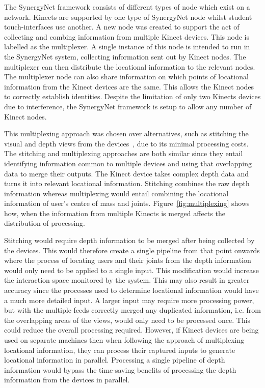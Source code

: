 \documentclass[link]{IWCOMP}
\begin{document}
The SynergyNet framework consists of different types of node which exist on a network.
Kinects are supported by one type of SynergyNet node whilst student touch-interfaces use another.
A new node was created to support the act of collecting and combing information from multiple Kinect devices.
This node is labelled as the multiplexer.
A single instance of this node is intended to run in the SynergyNet system, collecting information sent out by Kinect nodes.
The multiplexer can then distribute the locational information to the relevant nodes.
The multiplexer node can also share information on which points of locational information from the Kinect devices are the same.
This allows the Kinect nodes to correctly establish identities.
Despite the limitation of only two Kinects devices due to interference, the SynergyNet framework is setup to allow any number of Kinect nodes.

This multiplexing approach was chosen over alternatives, such as stitching the visual and depth views from the devices~\cite{Dubois2011}, due to its minimal processing costs.
The stitching and multiplexing approaches are both similar since they entail identifying information common to multiple devices and using that overlapping data to merge their outputs.
The Kinect device takes complex depth data and turns it into relevant locational information.
Stitching combines the raw depth information whereas multiplexing would entail combining the locational information of user's centre of mass and joints.
Figure~\ref{fig:multiplexing} shows how, when the information from multiple Kinects is merged affects the distribution of processing.

Stitching would require depth information to be merged after being collected by the devices.
This would therefore create a single pipeline from that point onwards where the process of locating users and their joints from the depth information would only need to be applied to a single input.
This modification would increase the interaction space monitored by the system.
This may also result in greater accuracy since the processes used to determine locational information would have a much more detailed input.
A larger input may require more processing power, but with the multiple feeds correctly merged any duplicated information, i.e. from the overlapping areas of the views, would only need to be processed once.
This could reduce the overall processing required.
However, if Kinect devices are being used on separate machines then when following the approach of multiplexing locational information, they can process their captured inputs to generate locational information in parallel.
Processing a single pipeline of depth information would bypass the time-saving benefits of processing the depth information from the devices in parallel.
\end{document}
